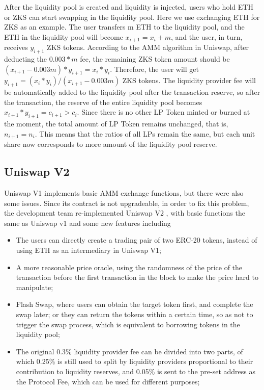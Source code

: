 \documentclass[]{template/llncs}
\begin{document}
After the liquidity pool is created and liquidity is injected, users who hold ETH or ZKS can start swapping in the liquidity pool. Here we use exchanging ETH for ZKS as an example. The user transfers m ETH to the liquidity pool, and the ETH in the liquidity pool will become $x_{i+1} = x_i + m$, and the user, in turn, receives $y_{i+1}$ ZKS tokens. According to the AMM algorithm in Uniswap, after deducting the $0.003*m$ fee, the remaining ZKS token amount should be $(x_{i+1} - 0.003m)*y_{i+1} = x_i*y_i$. Therefore, the user will get $y_{i+1} = (x_i*y_i)/(x_{i+1} - 0.003m)$ ZKS tokens. The liquidity provider fee will be automatically added to the liquidity pool after the transaction reserve, so after the transaction, the reserve of the entire liquidity pool becomes $x_{i+1}*y_{i+1} = c_{i+1}> c_i$. Since there is no other LP Token minted or burned at the moment, the total amount of LP Token remains unchanged, that is, $n_{i+1} = n_i$. This means that the ratios of all LPs remain the same, but each unit share now corresponds to more amount of the liquidity pool reserve.



\subsection{Uniswap V2}
Uniswap V1 implements basic AMM exchange functions, but there were also some issues. Since its contract is not upgradeable, in order to fix this problem, the development team re-implemented Uniswap V2 \cite{uniswapv2}, with basic functions the same as Uniswap v1 and some new features including


\begin{itemize}
	\item The users can directly create a trading pair of two ERC-20 tokens, instead of using ETH as an intermediary in Uniswap V1;
	\item A more reasonable price oracle, using the randomness of the price of the transaction before the first transaction in the block to make the price hard to manipulate; 
	\item Flash Swap, where users can obtain the target token first, and complete the swap later; or they can return the tokens within a certain time, so as not to trigger the swap process, which is equivalent to borrowing tokens in the liquidity pool;
	\item The original 0.3\% liquidity provider fee can be divided into two parts, of which 0.25\% is still used to split by liquidity providers proportional to their contribution to liquidity reserves, and 0.05\% is sent to the pre-set address as the Protocol Fee, which can be used for different purposes;

\end{itemize}
\end{document}

